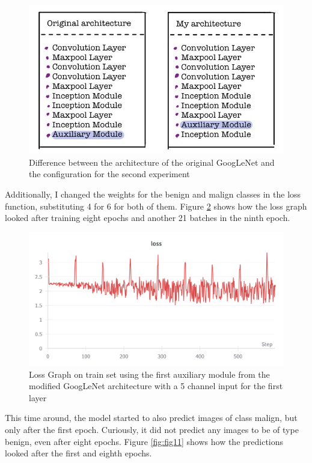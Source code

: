 \begin{figure}
    \centering
    \includegraphics[width=0.5\linewidth]{figures/Figure53.png}
    \caption{Difference between the architecture of the original GoogLeNet and the configuration for the second experiment}
    \label{fig:fig41}
\end{figure}

Additionally, I changed the weights for the benign and malign classes in the loss function, substituting 4 for 6 for both of them. Figure \ref{fig:fig10} shows how the loss graph looked after training eight epochs and another 21 batches in the ninth epoch.

\begin{figure}[!ht]
    \centering
    \includegraphics[width=1\textwidth]{figures/Figure11.png}
    \caption{Loss Graph on train set using the first auxiliary module from the modified GoogLeNet architecture with a 5 channel input for the first layer}
    \label{fig:fig10}
\end{figure}

This time around, the model started to also predict images of class malign, but only after the first epoch. Curiously, it did not predict any images to be of type benign, even after eight epochs. Figure \ref{fig:fig11} shows how the predictions looked after the first and eighth epochs.

